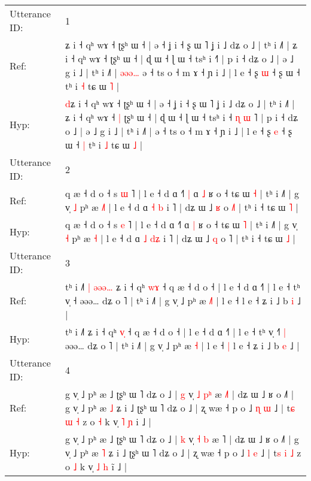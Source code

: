 \documentclass[10pt]{article}
\DeclareRobustCommand{\hl}[1]{{\textcolor{red}{#1}}}
\begin{document}
\begin{longtable}{ll}
\toprule
Utterance ID: & 1 \\
Ref: & \hl{}ʑ i ˧ qʰ wɤ ˧ ʈʂʰ ɯ ˧ | ə ˧ ʝ i ˧ ʂ ɯ ˥ ʝ i ˩ dʑ o ˩ | tʰ i ˩˥ | ʑ i ˧ qʰ wɤ ˧\hl{}\hl{} ʈʂʰ ɯ ˧ | ɖ ɯ ˧ ɭ ɯ ˧ tsʰ i ˧\hl{}\hl{}\hl{}\hl{}\hl{}˥ | p i ˧ dʑ o ˩ | ə ˩ g i ˩ | tʰ i ˩˥ |\hl{ }\hl{ə}\hl{ə}\hl{ə}\hl{…} ə ˧ ts o ˧ m ɤ ˧ ɲ i ˩ | l e ˧ ʂ \hl{ɯ} ˧ ʂ ɯ ˧\hl{}\hl{} tʰ i \hl{˧} tɕ ɯ \hl{˥} |
 \\
Hyp: & \hl{d}ʑ i ˧ qʰ wɤ ˧ ʈʂʰ ɯ ˧ | ə ˧ ʝ i ˧ ʂ ɯ ˥ ʝ i ˩ dʑ o ˩ | tʰ i ˩˥ | ʑ i ˧ qʰ wɤ ˧\hl{ }\hl{|} ʈʂʰ ɯ ˧ | ɖ ɯ ˧ ɭ ɯ ˧ tsʰ i ˧\hl{ }\hl{ɳ}\hl{ }\hl{ɯ}\hl{ }˥ | p i ˧ dʑ o ˩ | ə ˩ g i ˩ | tʰ i ˩˥ |\hl{}\hl{}\hl{}\hl{}\hl{} ə ˧ ts o ˧ m ɤ ˧ ɲ i ˩ | l e ˧ ʂ \hl{e} ˧ ʂ ɯ ˧\hl{ }\hl{|} tʰ i \hl{˩} tɕ ɯ \hl{˩} |
 \\
\midrule
Utterance ID: & 2 \\
Ref: & q æ ˧ d o ˧ s \hl{ɯ} ˥ | l e ˧ d ɑ ˧˥\hl{ }\hl{|} ɑ \hl{˩} ʁ o ˧ tɕ ɯ \hl{˧} | tʰ i ˩˥ | g v̩ \hl{˩} pʰ æ \hl{˩}\hl{˥} | l e ˧ d ɑ \hl{˧} \hl{}\hl{b} i ˥ | dʑ ɯ ˩ \hl{ʁ} o \hl{˩}˥ | tʰ i ˧ tɕ ɯ \hl{˥} |
 \\
Hyp: & q æ ˧ d o ˧ s \hl{e} ˥ | l e ˧ d ɑ ˧˥\hl{}\hl{} ɑ \hl{|} ʁ o ˧ tɕ ɯ \hl{˥} | tʰ i ˩˥ | g v̩ \hl{˧} pʰ æ \hl{}\hl{˧} | l e ˧ d ɑ \hl{˩} \hl{d}\hl{ʑ} i ˥ | dʑ ɯ ˩ \hl{q} o \hl{}˥ | tʰ i ˧ tɕ ɯ \hl{˩} |
 \\
\midrule
Utterance ID: & 3 \\
Ref: & tʰ i ˩˥\hl{ }\hl{|}\hl{ }\hl{ə}\hl{ə}\hl{ə}\hl{…} ʑ i ˧ qʰ \hl{w}\hl{ɤ} ˧ q æ ˧ d o ˧ | l e ˧ d ɑ ˧˥ | l e ˧ tʰ v̩ ˧\hl{}\hl{}\hl{} əəə… dʑ o ˥ | tʰ i ˩˥ | g v̩ ˩ pʰ æ \hl{˩}\hl{˥} | l e ˧\hl{}\hl{} l e ˧ ʑ i ˩ b \hl{i} ˩ |
 \\
Hyp: & tʰ i ˩˥\hl{}\hl{}\hl{}\hl{}\hl{}\hl{}\hl{} ʑ i ˧ qʰ \hl{v}\hl{̩} ˧ q æ ˧ d o ˧ | l e ˧ d ɑ ˧˥ | l e ˧ tʰ v̩ ˧\hl{˥}\hl{ }\hl{|} əəə… dʑ o ˥ | tʰ i ˩˥ | g v̩ ˩ pʰ æ \hl{}\hl{˧} | l e ˧\hl{ }\hl{|} l e ˧ ʑ i ˩ b \hl{e} ˩ |
 \\
\midrule
Utterance ID: & 4 \\
Ref: & g v̩ ˩ pʰ æ ˩ ʈʂʰ ɯ ˥ dʑ o ˩ | \hl{g} v̩ \hl{˩} \hl{p}\hl{ʰ} æ \hl{˩}˥ | dʑ ɯ ˩ ʁ o ˩˥ | g v̩ ˩ pʰ æ \hl{˩} ʑ i ˩ ʈʂʰ ɯ ˥ dʑ o ˩ | ʐ wæ ˧ p o ˩ \hl{ɳ} \hl{ɯ} ˩ | t\hl{ɕ} \hl{ɯ} \hl{˧} z o \hl{˧} k v̩ \hl{˥} \hl{ɲ} i\hl{} ˩ |
 \\
Hyp: & g v̩ ˩ pʰ æ ˩ ʈʂʰ ɯ ˥ dʑ o ˩ | \hl{k} v̩ \hl{˧} \hl{}\hl{b} æ \hl{}˥ | dʑ ɯ ˩ ʁ o ˩˥ | g v̩ ˩ pʰ æ \hl{˥} ʑ i ˩ ʈʂʰ ɯ ˥ dʑ o ˩ | ʐ wæ ˧ p o ˩ \hl{l} \hl{e} ˩ | t\hl{s} \hl{i} \hl{˩} z o \hl{˩} k v̩ \hl{˩} \hl{h} i\hl{̃} ˩ |

\end{longtable}
\end{document}
